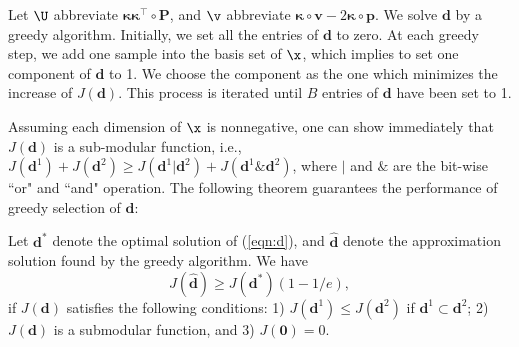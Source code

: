 Let $\U$ abbreviate $\bm\kappa\bm\kappa^\top\circ\mathbf P$, and $\v$ abbreviate $\bm\kappa\circ\mathbf v- 2\bm\kappa\circ\mathbf p$. We solve $\mathbf d$ by a greedy algorithm. Initially, we set all the entries of $\mathbf d$ to zero. At each greedy step, we add one sample into the basis set of $\x$, which implies to set one component of $\mathbf d$ to 1. We choose the component as the one which minimizes the increase of $J(\mathbf d)$. This process is iterated until $B$ entries of $\mathbf d$ have been set to 1.

Assuming each dimension of $\x$ is nonnegative, one can show immediately that $J(\mathbf d)$ is a sub-modular function, i.e., $J(\mathbf d^1) + J(\mathbf d^2) \geq J(\mathbf d^1 | \mathbf d^2) + J(\mathbf d^1 \& \mathbf d^2)$, where $|$ and $\&$ are the bit-wise ``or" and ``and" operation. The following theorem guarantees the performance of greedy selection of $\mathbf d$:
\begin{theorem}
Let $\mathbf d^*$ denote the optimal solution of (\ref{eqn:d}), and $\hat{\mathbf d}$ denote the approximation solution found by the greedy algorithm. We have
\[
J(\hat{\mathbf d}) \geq J(\mathbf d^*)(1 - 1/ e),
\]
if $J(\mathbf d)$ satisfies the following conditions: 1) $J(\mathbf d^1)\leq J(\mathbf d^2)$ if $\mathbf d^1\subset \mathbf d^2$; 2) $J(\mathbf d)$ is a submodular function, and 3) $J(\mathbf 0)=0$.
\end{theorem}




%
%
%
%
%
%
%
%
%
%
%
%
%
%
%


